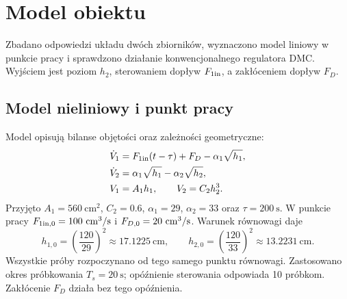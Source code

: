 \chapter{Model obiektu}
Zbadano odpowiedzi układu dwóch zbiorników, wyznaczono model liniowy w punkcie pracy i sprawdzono działanie konwencjonalnego regulatora DMC. Wyjściem jest poziom $h_2$, sterowaniem dopływ $F_{1\mathrm{in}}$, a zakłóceniem dopływ $F_D$.

\section{Model nieliniowy i punkt pracy}
Model opisują bilanse objętości oraz zależności geometryczne:
\begin{align}
\dot V_1&=F_{1\mathrm{in}}(t-\tau)+F_D-\alpha_1\sqrt{h_1},\\
\dot V_2&=\alpha_1\sqrt{h_1}-\alpha_2\sqrt{h_2},\\
V_1&=A_1h_1,\qquad V_2=C_2h_2^3.
\end{align}
Przyjęto $A_1=560\ \mathrm{cm^2}$, $C_2=\num{0.6}$, $\alpha_1=29$, $\alpha_2=33$ oraz $\tau=200\ \mathrm{s}$. W punkcie pracy $F_{1\mathrm{in},0}=100\ \mathrm{cm^3/s}$ i $F_{D,0}=20\ \mathrm{cm^3/s}$. Warunek równowagi daje
\begin{equation}
h_{1,0}=\left(\frac{120}{29}\right)^2\approx\num{17.1225}\ \mathrm{cm},\qquad
h_{2,0}=\left(\frac{120}{33}\right)^2\approx\num{13.2231}\ \mathrm{cm}.
\end{equation}
Wszystkie próby rozpoczynano od tego samego punktu równowagi. Zastosowano okres próbkowania $T_s=20\ \mathrm{s}$; opóźnienie sterowania odpowiada 10 próbkom. Zakłócenie $F_D$ działa bez tego opóźnienia.
